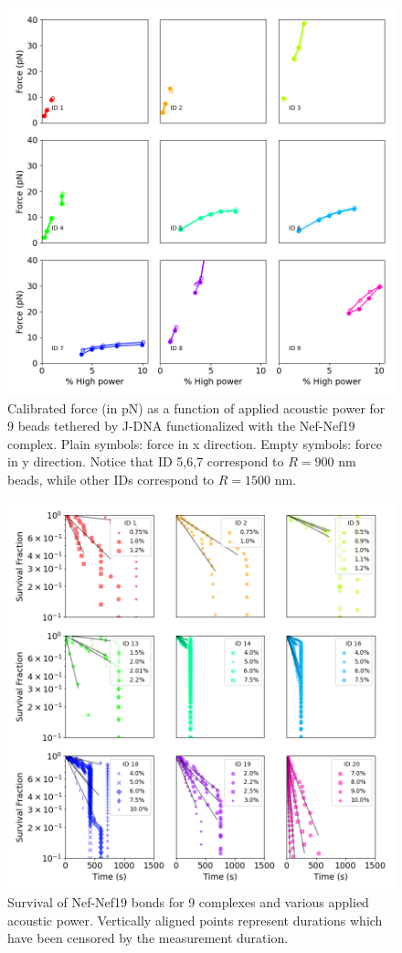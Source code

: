 \documentclass{biophys-new}
\begin{document}
\begin{figure}[hbt!]
	\centering
	\centerline {\includegraphics[width=0.75\linewidth]{Figures/Power_vs_Force_Bis_Nef.png}}
	\caption{Calibrated force (in pN) as a function of applied acoustic power for 9 beads tethered by J-DNA  functionalized with the Nef-Nef19 complex.  Plain symbols: force in x direction. Empty symbols: force in y direction. Notice that ID 5,6,7 correspond to $R= 900$ nm beads, while other IDs correspond to $R=1500$ nm.}
	\label{fig:PowerForce_Nef}	
\end{figure}

\begin{figure}[hbt!]
	\centering
	\centerline {\includegraphics[width=0.75\linewidth]{Figures/multisurvival2Bis_Nef.png}}
	\caption{Survival of Nef-Nef19 bonds for 9 complexes and various applied acoustic power. Vertically aligned points represent durations which have been censored by the measurement duration.}
	\label{fig:MultiSurvival_Nef}	
\end{figure}
\end{document}
